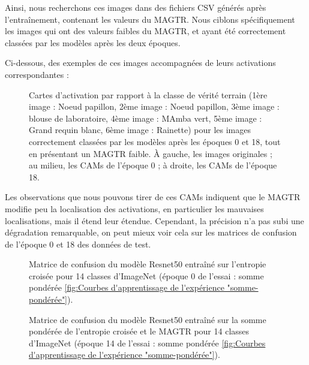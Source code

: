 \documentclass{report}
\begin{document}
{Ainsi, nous recherchons ces images dans des fichiers CSV générés après l'entraînement, contenant les valeurs du MAGTR. Nous ciblons spécifiquement les images qui ont des valeurs faibles du MAGTR, et ayant été correctement classées par les modèles après les deux époques.

Ci-dessous, des exemples de ces images accompagnées de leurs activations correspondantes :
    \begin{figure}[htbp] 
	\centering
	\caption{Cartes d'activation par rapport à la classe de vérité terrain (1ère image : Noeud papillon, 2ème image : Noeud papillon, 3ème image : blouse de laboratoire, 4ème image : MAmba vert, 5ème image : Grand requin blanc, 6ème image : Rainette) pour les images correctement classées par les modèles après les époques 0 et 18, tout en présentant un MAGTR faible. À gauche, les images originales ; au milieu, les CAMs de l'époque 0 ; à droite, les CAMs de l'époque 18.}
	\label{fig:CAMs de CE & Sum"}
    \end{figure}
\newpage
Les observations que nous pouvons tirer de ces CAMs indiquent que le MAGTR modifie peu la localisation des activations, en particulier les mauvaises localisations, mais il étend leur étendue. Cependant, la précision n'a pas subi une dégradation remarquable, on peut mieux voir cela sur les matrices de confusion de l'époque 0 et 18 des données de test.
    \begin{figure}[htbp] 
	\centering
	\caption{Matrice de confusion du modèle Resnet50 \cite{he2016identity} entraîné sur l'entropie croisée pour 14 classes d'ImageNet (époque 0 de l'essai : somme pondérée \ref{fig:Courbes d'apprentissage de l'expérience "somme-pondérée"}).}
	\label{fig:Matrice de confusion ep0"}
    \end{figure}
    
    \begin{figure}[htbp] 
	\centering
	\caption{Matrice de confusion du modèle Resnet50 \cite{he2016identity} entraîné sur la somme pondérée de l'entropie croisée et le MAGTR pour 14 classes d'ImageNet (époque 14 de l'essai : somme pondérée \ref{fig:Courbes d'apprentissage de l'expérience "somme-pondérée"}).}
	\label{fig:Matrice de confusion ep18"}
    \end{figure}

}
\end{document}
